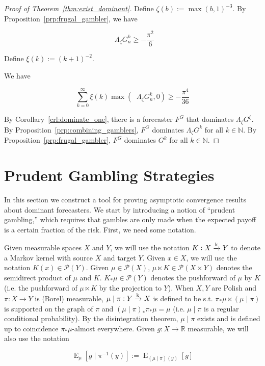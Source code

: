 \documentclass[11pt]{article}
\theoremstyle{definition}
\theoremstyle{plain}
\newcommand{\Nats}{\mathbb{N}}
\newcommand{\Reals}{\mathbb{R}}
\DeclareMathOperator{\E}{E}
\newcommand{\M}{\xrightarrow{\textnormal{k}}}
\newcommand{\PM}{\mathcal{P}}
\DeclareMathOperator{\SVM}{\Sigma V_{\min}}
\newcommand{\Bd}{\Lambda}
\begin{document}
\begin{proof}[Proof of Theorem~\ref{thm:exist_dominant}]

Define $\zeta(b) := \max(b,1)^{-3}$. By Proposition~\ref{prp:frugal_gambler}, we have

\[\SVM \Bd_{\zeta} G^k_n \geq -\frac{\pi^2}{6}\]

Define $\xi(k):=(k+1)^{-2}$.

We have

\[\sum_{k=0}^\infty \xi(k) \max(\SVM \Bd_{\zeta} G^k_n, 0) \geq -\frac{\pi^4}{36} \]

By Corollary~\ref{crl:dominate_one}, there is a forecaster $F^G$ that dominates $\Bd_\zeta G^\xi$. By Proposition~\ref{prp:combining_gamblers}, $F^G$ dominates $\Bd_\zeta G^k$ for all $k \in \Nats$. By Proposition~\ref{prp:frugal_gambler}, $F^G$ dominates $G^k$ for all $k \in \Nats$.
\end{proof}

\section{Prudent Gambling Strategies}
\label{sec:prudent}

In this section we construct a tool for proving asymptotic convergence results about dominant forecasters. We start by introducing a notion of \enquote{prudent gambling,} which requires that gambles are only made when the expected payoff is a certain fraction of the risk. First, we need some notation.

Given measurable spaces $X$ and $Y$, we will use the notation $K: X \M Y$ to denote a Markov kernel with source $X$ and target $Y$. Given $x \in X$, we will use the notation $K(x) \in \PM(Y)$. Given $\mu \in \PM(X)$, $\mu \ltimes K \in \PM(X \times Y)$ denotes the semidirect product of $\mu$ and $K$. $K_* \mu \in \PM(Y)$ denotes the pushforward of $\mu$ by $K$ (i.e. the pushforward of $\mu \ltimes K$ by the projection to $Y$). When $X,Y$ are Polish and $\pi: X \rightarrow Y$ is (Borel) measurable, $\mu \mid \pi: Y \M X$ is defined to be s.t. $\pi_* \mu \ltimes (\mu \mid \pi)$ is supported on the graph of $\pi$ and $(\mu \mid \pi)_* \pi_* \mu = \mu$ (i.e. $\mu \mid \pi$ is a regular conditional probability). By the disintegration theorem, $\mu \mid \pi$ exists and is defined up to coincidence $\pi_* \mu$-almost everywhere. Given $g: X \rightarrow \Reals$ measurable, we will also use the notation 

\begin{equation}
\E_{\mu}[g \mid \pi^{-1}(y)]:=\E_{(\mu \mid \pi)(y)}[g]
\end{equation}
\end{document}
